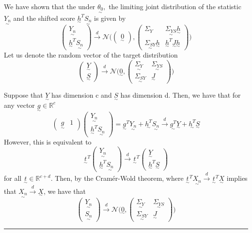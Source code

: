 \documentclass[twoside]{article}
\newenvironment{proof}{{\bf Proof:}}{\hfill\rule{2mm}{2mm}}
\newcommand{\utilde}{\underset{\sim}}
\begin{document}
\begin{proof} We have shown that the under $\utilde{\theta_0},$ the limiting joint distribution of the statistic $\utilde{Y_n}$ and the shifted score $\utilde{h}^T\utilde{S_n}$ is given by 
$$
\begin{pmatrix}
\utilde{Y_n}\\
\utilde{h}^T\utilde{S_n}
\end{pmatrix}
 \xrightarrow{d} \mathcal{N}
\bigg( 
\begin{pmatrix}
\utilde{0}
\end{pmatrix}
,
\begin{pmatrix}
\Sigma_Y & \utilde{\Sigma_{YS}}\utilde{h} \\
\utilde{\Sigma_{SY}}\utilde{h} & \utilde{h}^T\utilde{J}\utilde{h}
\end{pmatrix}
\bigg)
$$
Let us denote the random vector of the target distribution
$$
\begin{pmatrix}
\utilde{Y}\\
\utilde{S}
\end{pmatrix}
\xrightarrow{d}
\mathcal{N}\bigg(\utilde{0}, 
\begin{pmatrix}
\utilde{\Sigma_Y} & \utilde{\Sigma_{YS}} \\
\utilde{\Sigma_{SY}} & \utilde{J}
\end{pmatrix}
 \bigg)
$$

Suppose that $\utilde{Y}$ has dimension c and $\utilde{S}$ has dimension d. Then, we have that for any vector $\utilde{g} \in \mathbb{R}^c$
$$
\begin{pmatrix}
\utilde{g} & 1
\end{pmatrix}
\begin{pmatrix}
\utilde{Y_n}\\
\utilde{h}^T\utilde{S_n}
\end{pmatrix} = \utilde{g}^T\utilde{Y_n} + \utilde{h^T}\utilde{S_n} \xrightarrow{d} \utilde{g^T}\utilde{Y} + \utilde{h^T}\utilde{S}
$$
However, this is equivalent to 
$$
\utilde{t}^T\begin{pmatrix}
\utilde{Y_n}\\
\utilde{h}^T\utilde{S_n}
\end{pmatrix} \xrightarrow{d}
\utilde{t}^T\begin{pmatrix}
\utilde{Y}\\
\utilde{h}^T\utilde{S}
\end{pmatrix}
$$
for all $\utilde{t} \in \mathbb{R}^{c + d}.$ Then, by the Cramér-Wold theorem, where $\utilde{t}^T\utilde{X_n} \xrightarrow{d} \utilde{t}^T\utilde{X}$ implies that $\utilde{X_n} \xrightarrow{d} \utilde{X}$, we have that 
$$
\begin{pmatrix}
\utilde{Y_n}\\
\utilde{S_n}
\end{pmatrix}
\xrightarrow{d}
\mathcal{N}\bigg(\utilde{0}, 
\begin{pmatrix}
\utilde{\Sigma_Y} & \utilde{\Sigma_{YS}} \\
\utilde{\Sigma_{SY}} & \utilde{J}
\end{pmatrix}
 \bigg)
$$
\end{proof}
\end{document}
